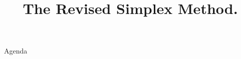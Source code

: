 \documentclass[../slides.tex]{subfiles}
\title{The Revised Simplex Method.}
\begin{document}
\begin{frame}
  \maketitle
\end{frame}


\begin{frame}{Agenda}
  \tableofcontents
\end{frame}




\begin{frame}
  \maketitle
\end{frame}
\end{document}
